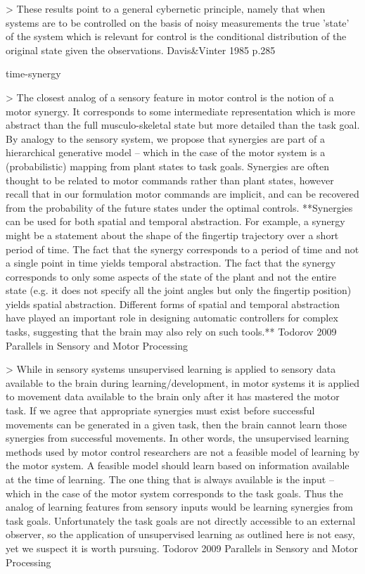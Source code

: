 \documentclass[../main.tex]{subfiles}
\begin{document}
{{> These results point to a general cybernetic principle, namely that when systems are to be controlled on the basis of noisy measurements the true 'state' of the system which is relevant for control is the conditional distribution of the original state given the observations. Davis&Vinter 1985 p.285



time-synergy

> The closest analog of a sensory feature in motor control is the notion of a motor synergy. It corresponds to some intermediate representation which is more abstract than the full musculo-skeletal state but more detailed than the task goal. By analogy to the sensory system, we propose that synergies are part of a hierarchical generative model – which in the case of the motor system is a (probabilistic) mapping from plant states to task goals. Synergies are often thought to be related to motor commands rather than plant states, however recall that in our formulation motor commands are implicit, and can be recovered from the probability of the future states under the optimal controls. **Synergies can be used for both spatial and temporal abstraction. For example, a synergy might be a statement about the shape of the fingertip trajectory over a short period of time. The fact that the synergy corresponds to a period of time and not a single point in time yields temporal abstraction. The fact that the synergy corresponds to only some aspects of the state of the plant and not the entire state (e.g. it does not specify all the joint angles but only the fingertip position) yields spatial abstraction. Different forms of spatial and temporal abstraction have played an important role in designing automatic controllers for complex tasks, suggesting that the brain may also rely on such tools.** Todorov 2009 Parallels in Sensory and Motor Processing



> While in sensory systems unsupervised learning is applied to sensory data available to the brain during learning/development, in motor systems it is applied to movement data available to the brain only after it has mastered the motor task. If we agree that appropriate synergies must exist before successful movements can be generated in a given task, then the brain cannot learn those synergies from successful movements. In other words, the unsupervised learning methods used by motor control researchers are not a feasible model of learning by the motor system. A feasible model should learn based on information available at the time of learning. The one thing that is always available is the input – which in the case of the motor system corresponds to the task goals. Thus the analog of learning features from sensory inputs would be learning synergies from task goals. Unfortunately the task goals are not directly accessible to an external observer, so the application of unsupervised learning as outlined here is not easy, yet we suspect it is worth pursuing. Todorov 2009 Parallels in Sensory and Motor Processing



}}
\end{document}
